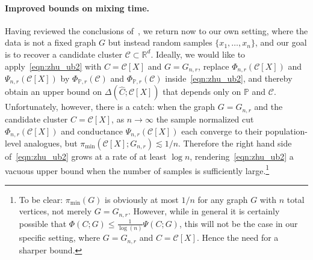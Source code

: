 \documentclass[11pt,twoside]{article}
\newcommand{\Reals}{\mathbb{R}}
\newcommand{\1}{\mathbf{1}}
\newcommand{\Rd}{\Reals^d}
\newcommand{\mc}[1]{\mathcal{#1}}
\newcommand{\Pbb}{\mathbb{P}}
\newcommand{\wh}[1]{\widehat{#1}}
\begin{document}
\paragraph{Improved bounds on mixing time.} Having reviewed the conclusions of~\cite{zhu2013}, we return now to our own setting, where the data is not a fixed graph $G$ but instead random samples $\{x_1,\ldots,x_n\}$, and our goal is to recover a candidate cluster $\mc{C} \subset \Rd$. Ideally, we would like to apply~\eqref{eqn:zhu_ub2} with $C = \mc{C}[X]$ and $G = G_{n,r}$, replace $\Phi_{n,r}(\mc{C}[X])$ and $\Psi_{n,r}(\mc{C}[X])$ by $\Phi_{\Pbb,r}(\mc{C})$ and $\Phi_{\Pbb,r}(\mc{C})$ inside~\eqref{eqn:zhu_ub2}, and thereby obtain an upper bound on $\Delta(\wh{C};\mc{C}[X])$ that depends only on $\Pbb$ and $\mc{C}$. Unfortunately, however, there is a catch: when the graph $G = G_{n,r}$ and the candidate cluster $C = \mc{C}[X]$, as $n \to \infty$ the sample normalized cut $\Phi_{n,r}(\mc{C}[X])$ and conductance $\Psi_{n,r}(\mc{C}[X])$ each converge to their population-level analogues, but $\pi_{\min}(\mc{C}[X];G_{n,r}) \lesssim 1/n$. Therefore the right hand side of~\eqref{eqn:zhu_ub2} grows at a rate of at least $\log n$, rendering~\eqref{eqn:zhu_ub2} a vacuous upper bound when the number of samples is sufficiently large.\footnote{To be clear: $\pi_{\min}(G)$ is obviously at most $1/n$ for any graph $G$ with $n$ total vertices, not merely $G = G_{n,r}$. However, while in general it is certainly possible that $\Phi(C;G) \leq \frac{1}{\log(n)} \Psi(C;G)$, this will not be the case in our specific setting, where $G = G_{n,r}$ and $C = \mc{C}[X]$. Hence the need for a sharper bound.} 
\end{document}
